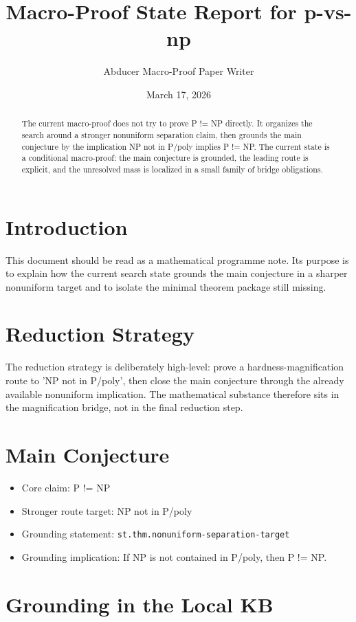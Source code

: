 \documentclass[11pt]{article}
\title{Macro-Proof State Report for p-vs-np}
\author{Abducer Macro-Proof Paper Writer}
\date{March 17, 2026}
\begin{document}
\maketitle

\begin{abstract}
The current macro-proof does not try to prove P != NP directly. It organizes the search around a stronger nonuniform separation claim, then grounds the main conjecture by the implication NP not in P/poly implies P != NP. The current state is a conditional macro-proof: the main conjecture is grounded, the leading route is explicit, and the unresolved mass is localized in a small family of bridge obligations.
\end{abstract}

\section{Introduction}
This document should be read as a mathematical programme note. Its purpose is to explain how the current search state grounds the main conjecture in a sharper nonuniform target and to isolate the minimal theorem package still missing.

\section{Reduction Strategy}
The reduction strategy is deliberately high-level: prove a hardness-magnification route to 'NP not in P/poly', then close the main conjecture through the already available nonuniform implication. The mathematical substance therefore sits in the magnification bridge, not in the final reduction step.

\section{Main Conjecture}
\begin{itemize}[leftmargin=*,itemsep=0.2em]
\item Core claim: P != NP
\item Stronger route target: NP not in P/poly
\item Grounding statement: \texttt{st.thm.nonuniform-separation-target}
\item Grounding implication: If NP is not contained in P/poly, then P != NP.
\end{itemize}

\section{Grounding in the Local KB}
\end{document}

